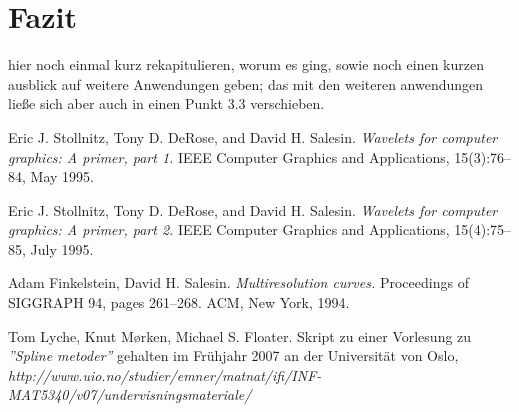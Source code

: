 \documentclass{article}
\begin{document}
\section{Fazit}
%
hier noch einmal kurz rekapitulieren, worum es ging, sowie noch einen kurzen ausblick auf weitere Anwendungen geben; das mit den weiteren anwendungen ließe sich aber auch in einen Punkt 3.3 verschieben.
%
%
%
%

\begin{thebibliography}{9}

Eric J. Stollnitz, Tony D. DeRose, and David H. Salesin.
\textit{Wavelets for computer graphics: A primer, part 1.}
IEEE Computer Graphics and Applications, 15(3):76–84,
May 1995.

Eric J. Stollnitz, Tony D. DeRose, and David H. Salesin.
\textit{Wavelets for computer graphics: A primer, part 2.}
IEEE Computer Graphics and Applications, 15(4):75–85,
July 1995.

Adam Finkelstein, David H. Salesin.
\textit{Multiresolution curves.}
Proceedings of SIGGRAPH 94, pages 261–268.
ACM, New York, 1994.

Tom Lyche, Knut Mørken, Michael S. Floater.
Skript zu einer Vorlesung zu \textit{''Spline metoder''} gehalten im Frühjahr 2007 an der Universität von Oslo,
\textit{http://www.uio.no/studier/emner/matnat/ifi/INF-MAT5340/v07/undervisningsmateriale/}

\end{thebibliography}
\end{document}
